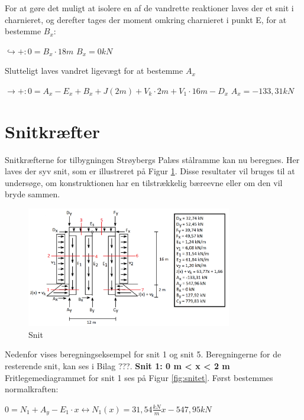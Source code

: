 For at gøre det muligt at isolere en af de vandrette reaktioner laves der et snit i charnieret, og derefter tages der moment omkring charnieret i punkt E, for at bestemme $B_x$:
\begin{center}
	$\hookrightarrow+: 0 = B_x \cdot 18m$
	\newline
	$B_x = 0 kN$
\end{center}

Slutteligt laves vandret ligevægt for at bestemme $A_x$
\begin{center}
	$\rightarrow+: 0 = A_x - E_x + B_x + J(2m) + V_k \cdot 2m + V_1 \cdot 16 m - D_x$
	\newline
	$A_x = -133,\!31 kN$
\end{center} 

\section{Snitkræfter}
Snitkræfterne for tilbygningen Strøybergs Palæs stålramme kan nu beregnes. Her laves der syv snit, som er illustreret på Figur \ref{fig:snitbrud}. Disse resultater vil bruges til at undersøge, om konstruktionen har en tilstrækkelig bæreevne eller om den vil bryde sammen. 

\begin{figure}[H]
	\centering
	\includegraphics[width=0.8\textwidth]{billeder/snitbrud.png}
	\caption{Snit}
	\label{fig:snitbrud}
\end{figure}

Nedenfor vises beregningseksempel for snit 1 og snit 5. Beregningerne for de resterende snit, kan ses i Bilag ???. 
\newline
\newline
\textbf{Snit 1: 0 m < x < 2 m}
\newline
Fritlegemediagrammet for snit 1 ses på Figur \ref{fig:snitet}.
\newline
\newline
Først bestemmes normalkraften:
\begin{center}
	$0 = N_1 + A_y - E_1 \cdot x \leftrightarrow N_1(x) = 31,\!54 \frac{kN}{m} x - 547,\!95 kN $
\end{center}

